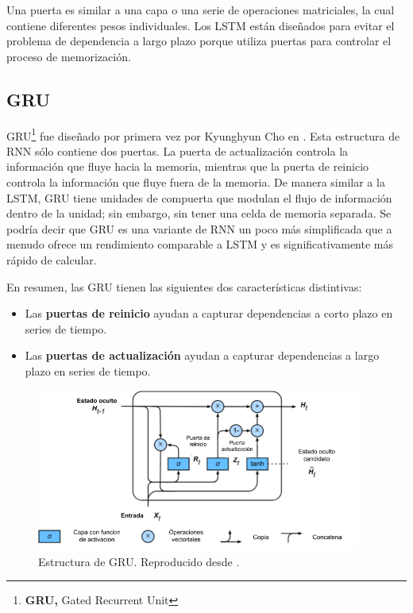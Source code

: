 \vspace{5mm} %

Una puerta es similar a una capa o una serie de operaciones matriciales, la cual contiene diferentes pesos individuales. Los LSTM est\'{a}n dise\~{n}ados para evitar el problema de dependencia a largo plazo porque utiliza puertas para controlar el proceso de memorizaci\'{o}n. 

\subsection{GRU}

GRU\footnote{\textbf{GRU, }Gated Recurrent Unit} fue dise\~{n}ado por primera vez por Kyunghyun Cho en \cite{55}. Esta estructura de RNN s\'{o}lo contiene dos puertas. La puerta de actualizaci\'{o}n controla la informaci\'{o}n que fluye hacia la memoria, mientras que la puerta de reinicio controla la informaci\'{o}n que fluye fuera de la memoria. De manera similar a la LSTM, GRU tiene unidades de compuerta que modulan el flujo de informaci\'{o}n dentro de la unidad; sin embargo, sin tener una celda de memoria separada. Se podr\'{i}a decir que GRU es una variante de RNN un poco m\'{a}s simplificada que a menudo ofrece un rendimiento comparable a LSTM y es significativamente m\'{a}s r\'{a}pido de calcular.

\vspace{5mm} %

En resumen, las GRU tienen las siguientes dos caracter\'{i}sticas distintivas:

\begin{itemize}
\item Las \textbf{puertas de reinicio} ayudan a capturar dependencias a corto plazo en series de tiempo.
\item Las \textbf{puertas de actualizaci\'{o}n} ayudan a capturar dependencias a largo plazo en series de tiempo.
\end{itemize}

\begin{figure}[h!]
  \begin{center}	\includegraphics[width=0.95\textwidth]{imagenes/Cap4/gru}
  \caption{Estructura de GRU. Reproducido desde \cite{56}.} 
  \label{fig:gru}
  \end{center}
\end{figure}


